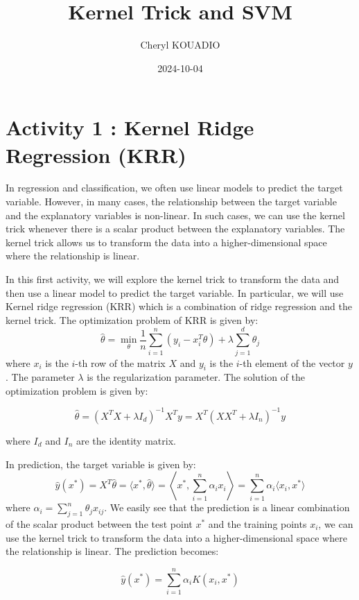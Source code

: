 \documentclass[
  letterpaper,
  DIV=11,
  numbers=noendperiod]{scrartcl}
\title{Kernel Trick and SVM}
\author{Cheryl KOUADIO}
\date{2024-10-04}
\begin{document}
\maketitle


\section{Activity 1 : Kernel Ridge Regression
(KRR)}\label{activity-1-kernel-ridge-regression-krr}

In regression and classification, we often use linear models to predict
the target variable. However, in many cases, the relationship between
the target variable and the explanatory variables is non-linear. In such
cases, we can use the kernel trick whenever there is a scalar product
between the explanatory variables. The kernel trick allows us to
transform the data into a higher-dimensional space where the
relationship is linear.

In this first activity, we will explore the kernel trick to transform
the data and then use a linear model to predict the target variable. In
particular, we will use Kernel ridge regression (KRR) which is a
combination of ridge regression and the kernel trick. The optimization
problem of KRR is given by: \[
\hat \theta = \min_{\theta} \frac{1}{n} \sum_{i=1}^n (y_i - x_i^T\theta)  + \lambda \sum_{j=1}^d \theta_j
\] where \(x_i\) is the \(i\)-th row of the matrix \(X\) and \(y_i\) is
the \(i\)-th element of the vector \(y\). The parameter \(\lambda\) is
the regularization parameter. The solution of the optimization problem
is given by:

\[
\hat \theta = (X^TX + \lambda I_d)^{-1}X^Ty = X^T (X X^T + \lambda I_n)^{-1}y
\]

where \(I_d\) and \(I_n\) are the identity matrix.

In prediction, the target variable is given by: \[
\hat{y}(x^*) = X^T \hat{\theta} = \langle x^*, \hat{\theta} \rangle = \left\langle x^*, \sum_{i=1}^{n} \alpha_i x_i \right\rangle = \sum_{i=1}^{n} \alpha_i \langle x_i, x^* \rangle
\] where \(\alpha_i = \sum_{j=1}^{n} \theta_j x_{ij}\). We easily see
that the prediction is a linear combination of the scalar product
between the test point \(x^*\) and the training points \(x_i\), we can
use the kernel trick to transform the data into a higher-dimensional
space where the relationship is linear. The prediction becomes:

\[
\hat{y}(x^*) = \sum_{i=1}^{n} \alpha_i K(x_i, x^*)
\]
\end{document}
